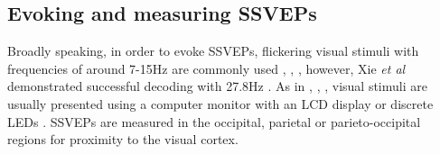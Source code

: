 \subsection{Evoking and measuring SSVEPs}
\label{subsection:evoking-measuring-ssveps}

Broadly speaking, in order to evoke SSVEPs, flickering visual stimuli with frequencies of around 7-15Hz are commonly used \cite{acampora-dataset}, \cite{Chen2017}, \cite{duart-comparing-ssvep-stimuli}, however, Xie \textit{et al} demonstrated successful decoding with 27.8Hz \cite{Xie2016}. As in \cite{acampora-dataset}, \cite{Chen2017}, \cite{autthasan-single-chan-ssvep}, visual stimuli are usually presented using a computer monitor with an LCD display or discrete LEDs \cite{chai-embedded-bci}. SSVEPs are measured in the occipital, parietal or parieto-occipital regions \cite{Fernandez-Fraga2016} for proximity to the visual cortex.

